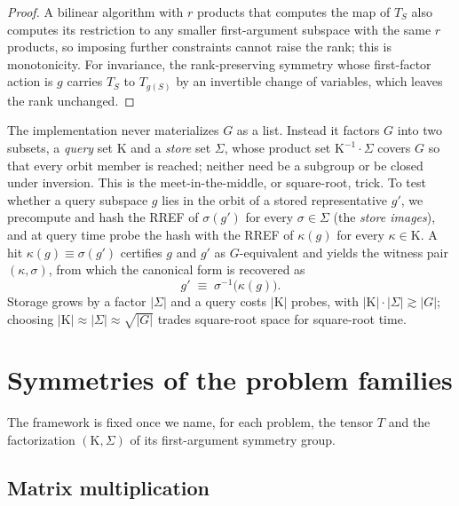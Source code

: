 \documentclass[11pt]{article}
\theoremstyle{definition}
\newcommand{\Kappa}{\mathrm{K}}
\begin{document}
\begin{proof}
  A bilinear algorithm with $r$ products that computes the map of $T_S$ also computes
  its restriction to any smaller first-argument subspace with the same $r$ products, so
  imposing further constraints cannot raise the rank; this is monotonicity. For
  invariance, the rank-preserving symmetry whose first-factor action is $g$ carries
  $T_S$ to $T_{g(S)}$ by an invertible change of variables, which leaves the rank
  unchanged.
\end{proof}

The implementation never materializes $G$ as a list. Instead it factors $G$ into two
subsets, a \emph{query} set $\Kappa$ and a \emph{store} set $\Sigma$, whose product
set $\Kappa^{-1}\cdot\Sigma$ covers $G$ so that every orbit member is reached; neither
need be a subgroup or be closed under inversion. This is the meet-in-the-middle, or
square-root, trick. To test whether a query subspace $g$ lies in the orbit of a
stored representative $g'$, we precompute and hash the RREF of $\sigma(g')$ for every
$\sigma\in\Sigma$ (the \emph{store images}), and at query time probe the hash with the
RREF of $\kappa(g)$ for every $\kappa\in\Kappa$. A hit $\kappa(g)\equiv \sigma(g')$
certifies $g$ and $g'$ as $G$-equivalent and yields the witness pair
$(\kappa,\sigma)$, from which the canonical form is recovered as
\begin{equation}\label{eq:witness}
  g' \;\equiv\; \sigma^{-1}\bigl(\kappa(g)\bigr).
\end{equation}
Storage grows by a factor $|\Sigma|$ and a query costs $|\Kappa|$
probes, with $|\Kappa|\cdot|\Sigma|\gtrsim |G|$; choosing
$|\Kappa|\approx|\Sigma|\approx\sqrt{|G|}$ trades square-root space for
square-root time.

\section{Symmetries of the problem families}\label{sec:symmetries}

The framework is fixed once we name, for each problem, the tensor $T$ and the
factorization $(\Kappa,\Sigma)$ of its first-argument symmetry group.

\subsection{Matrix multiplication}
\end{document}
